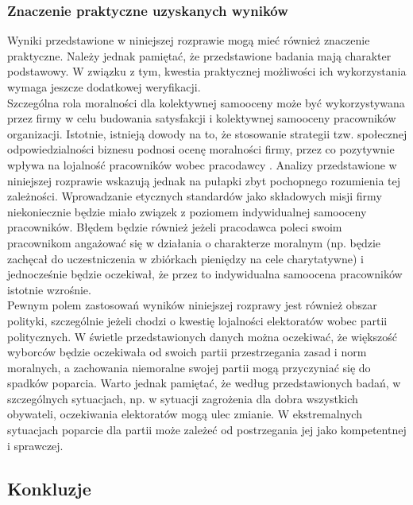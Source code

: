 \documentclass[man]{apa6}
\begin{document}
\subsubsection{Znaczenie praktyczne uzyskanych wyników}

Wyniki przedstawione w niniejszej rozprawie mogą mieć również znaczenie praktyczne. Należy jednak pamiętać, że przedstawione badania mają charakter podstawowy. W związku z tym, kwestia praktycznej możliwości ich wykorzystania wymaga jeszcze dodatkowej weryfikacji.\\

Szczególna rola moralności dla kolektywnej samooceny może być wykorzystywana przez firmy w celu budowania satysfakcji i kolektywnej samooceny pracowników organizacji. Istotnie, istnieją dowody na to, że stosowanie strategii tzw. społecznej odpowiedzialności biznesu podnosi ocenę moralności firmy, przez co pozytywnie wpływa na lojalność pracowników wobec pracodawcy \parencite{bauman2012corporate, ellemers2011corporate}. Analizy przedstawione w niniejszej rozprawie wskazują jednak na pułapki zbyt pochopnego rozumienia tej zależności. Wprowadzanie etycznych standardów jako składowych misji firmy niekoniecznie będzie miało związek z poziomem indywidualnej samooceny pracowników. Błędem będzie również jeżeli pracodawca poleci swoim pracownikom angażować się w działania o charakterze moralnym (np. będzie zachęcał do uczestniczenia w zbiórkach pieniędzy na cele charytatywne) i jednocześnie będzie oczekiwał, że przez to indywidualna samoocena pracowników istotnie wzrośnie.\\

Pewnym polem zastosowań wyników niniejszej rozprawy jest również obszar polityki, szczególnie jeżeli chodzi o kwestię  lojalności elektoratów wobec partii politycznych. W świetle przedstawionych danych można oczekiwać, że większość wyborców będzie oczekiwała od swoich partii przestrzegania zasad i norm moralnych, a zachowania niemoralne swojej partii mogą przyczyniać się do spadków poparcia. Warto jednak pamiętać, że według przedstawionych badań, w szczególnych sytuacjach, np. w sytuacji zagrożenia dla dobra wszystkich obywateli, oczekiwania elektoratów mogą ulec zmianie. W ekstremalnych sytuacjach poparcie dla partii może zależeć od postrzegania jej jako kompetentnej i sprawczej.\\

\subsection{Konkluzje}
\end{document}
